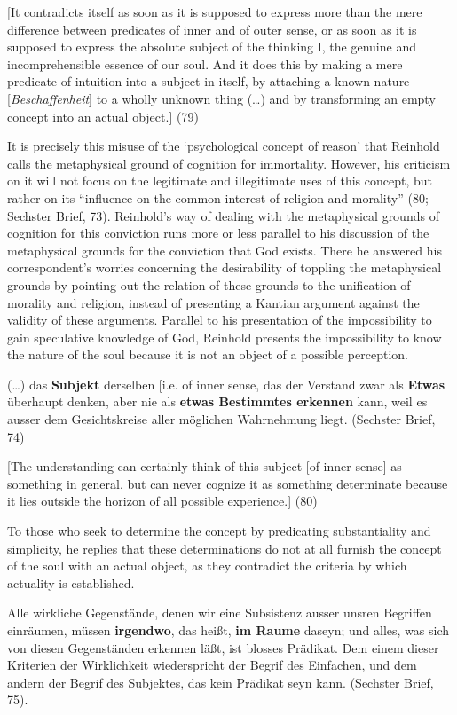 [It contradicts itself as soon as it is supposed to express more than the mere difference between predicates of inner and of outer sense, or as soon as it is supposed to express the absolute subject of the thinking I, the genuine and incomprehensible essence of our soul. And it does this by making a mere predicate of intuition into a subject in itself, by attaching a known nature [\textit{Beschaffenheit}] to a wholly unknown thing (\ldots ) and by transforming an empty concept into an actual object.] (79)

It is precisely this misuse of the `psychological concept of reason' that Reinhold calls the metaphysical ground of cognition for immortality. However, his criticism on it will not focus on the legitimate and illegitimate uses of this concept, but rather on its ``influence on the common interest of religion and morality'' (80; Sechster Brief, 73). Reinhold's way of dealing with the metaphysical grounds of cognition for this conviction runs more or less parallel to his discussion of the metaphysical grounds for the conviction that God exists. There he answered his correspondent's worries concerning the desirability of toppling the metaphysical grounds by pointing out the relation of these grounds to the unification of morality and religion, instead of presenting a Kantian argument against the validity of these arguments. Parallel to his presentation of the impossibility to gain speculative knowledge of God, Reinhold presents the impossibility to know the nature of the soul because it is not an object of a possible perception. 

(\ldots ) das \textbf{Subjekt} derselben [i.e. of inner sense, das der Verstand zwar als \textbf{Etwas} \"{u}berhaupt denken, aber nie als \textbf{etwas Bestimmtes erkennen} kann, weil es ausser dem Gesichtskreise aller m\"{o}glichen Wahrnehmung liegt. (Sechster Brief, 74)

[The understanding can certainly think of this subject [of inner sense] as something in general, but can never cognize it as something determinate because it lies outside the horizon of all possible experience.] (80)

To those who seek to determine the concept by predicating substantiality and simplicity, he replies that these determinations do not at all furnish the concept of the soul with an actual object, as they contradict the criteria by which actuality is established. 

Alle wirkliche Gegenst\"{a}nde, denen wir eine Subsistenz ausser unsren Begriffen einr\"{a}umen, m\"{u}ssen \textbf{irgendwo}, das hei\ss{}t, \textbf{im Raume} daseyn; und alles, was sich von diesen Gegenst\"{a}nden erkennen l\"{a}\ss{}t, ist blosses Pr\"{a}dikat. Dem einem dieser Kriterien der Wirklichkeit wiederspricht der Begrif des Einfachen, und dem andern der Begrif des Subjektes, das kein Pr\"{a}dikat seyn kann. (Sechster Brief, 75).

